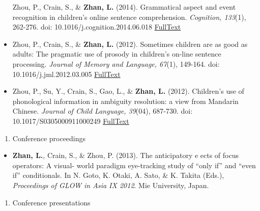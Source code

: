 \documentclass[10pt,]{article}
\providecommand{\tightlist}{%
  \setlength{\itemsep}{0pt}\setlength{\parskip}{0pt}}
\begin{document}
\begin{itemize}
  Zhou, P., Crain, S., \& \textbf{Zhan, L.} (2014). Grammatical aspect
  and event recognition in children's online sentence comprehension.
  \emph{Cognition, 133}(1), 262-276. doi:
  10.1016/j.cognition.2014.06.018
  \href{http://publications.likan.info/Cognition2014.pdf}{FullText}
\item
  Zhou, P., Crain, S., \& \textbf{Zhan, L.} (2012). Sometimes children
  are as good as adults: The pragmatic use of prosody in children's
  on-line sentence processing. \emph{Journal of Memory and Language,
  67}(1), 149-164. doi: 10.1016/j.jml.2012.03.005
  \href{https://publications.likan.info/JMemLang2012.pdf}{FullText}
\item
  Zhou, P., Su, Y., Crain, S., Gao, L., \& \textbf{Zhan, L.} (2012).
  Children's use of phonological information in ambiguity resolution: a
  view from Mandarin Chinese. \emph{Journal of Child Language, 39}(04),
  687-730. doi: 10.1017/S0305000911000249
  \href{https://publications.likan.info/JChildLang2012.pdf}{FullText}
\end{itemize}

\begin{enumerate}
\def\labelenumi{\arabic{enumi}.}
\setcounter{enumi}{2}
\tightlist
\item
  Conference proceedings
\end{enumerate}

\begin{itemize}
\tightlist
\item
  \textbf{Zhan, L.}, Crain, S., \& Zhou, P. (2013). The anticipatory e
  ects of focus operators: A visual- world paradigm eye-tracking study
  of ``only if'' and ``even if'' conditionals. In N. Goto, K. Otaki, A.
  Sato, \& K. Takita (Eds.), \emph{Proceedings of GLOW in Asia IX 2012}.
  Mie University, Japan.
\end{itemize}

\begin{enumerate}
\def\labelenumi{\arabic{enumi}.}
\setcounter{enumi}{3}
\tightlist
\item
  Conference presentations
\end{enumerate}
\end{document}
